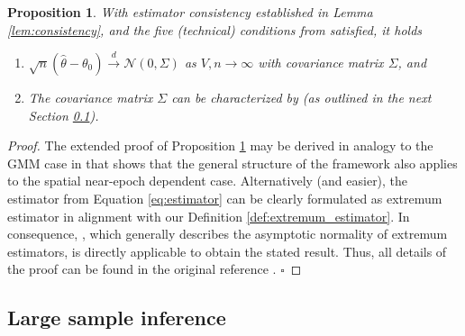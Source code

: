 \documentclass[12pt]{article}
\newtheorem{proposition}{Proposition}
\begin{document}
\begin{proposition}
	\label{prop:clt}
	With estimator consistency established in Lemma \ref{lem:consistency}, and the five (technical) conditions from \cite[Theorem 3.1]{NM94} satisfied, it holds
	\begin{enumerate}
		\item $\sqrt{n}(\hat{\theta} - \theta_0) \overset{d}{\to} \mathcal{N}(0,{\Sigma})$ as $V,n \to \infty$ with covariance matrix ${\Sigma}$, and
		\item The covariance matrix ${\Sigma}$ can be characterized by \citet[Theorem 11.2.b, Theorem H.1]{PP97} (as outlined in the next Section \ref{sec:asymptotic_inference}).
	\end{enumerate}
\end{proposition}

\begin{proof}
	The extended proof of Proposition \ref{prop:clt} may be derived in analogy to the GMM case in \cite[Theorem 4]{JP12} that shows that the general structure of the \cite{PP97} framework also applies to the spatial near-epoch dependent case.
	Alternatively (and easier), the estimator from Equation \ref{eq:estimator} can be clearly formulated as extremum estimator in alignment with our Definition \ref{def:extremum_estimator}.
	In consequence, \cite[Theorem 3.1]{NM94}, which generally describes the asymptotic normality of extremum estimators, is directly applicable to obtain the stated result.
	Thus, all details of the proof can be found in the original reference \cite[Chapter 3]{NM94}.
	$\square$
\end{proof}



\subsection{Large sample inference}
\label{sec:asymptotic_inference}
\end{document}
